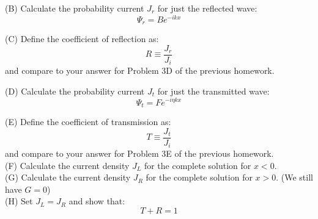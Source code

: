 \documentclass[12pt]{article}
\begin{document}
\noindent
(B) Calculate the probability current $J_r$ for just the reflected wave:
$$\Psi_r = B e^{-ikx}$$

\noindent
(C) Define the coefficient of reflection as:
$$R \equiv \frac{J_r}{J_i}$$
and compare to your answer for Problem 3D of the previous homework.

\noindent
(D) Calculate the probability current $J_t$ for just the transmitted wave:
$$\Psi_t = F e^{-i\eta kx}$$

\noindent
(E) Define the coefficient of transmission as:
$$T \equiv \frac{J_t}{J_i}$$
and compare to your answer for Problem 3E of the previous homework.\\[5pt]

\noindent
(F) Calculate the current density $J_L$ for the complete solution for $x<0$.\\[5pt]

\noindent
(G) Calculate the current density $J_R$ for the complete solution for $x>0$. (We still have $G=0$)\\[5pt]

\noindent
(H) Set $J_L = J_R$ and show that:
$$T + R = 1$$
\end{document}
